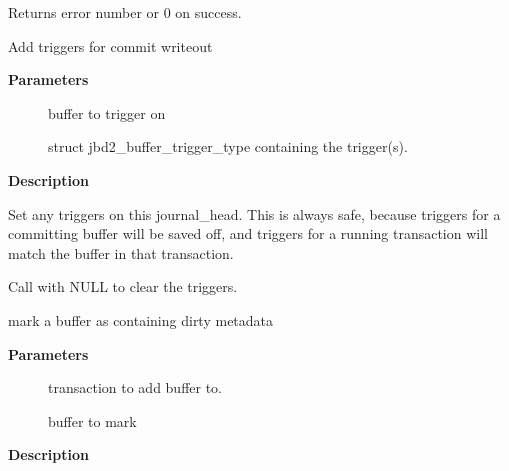 \documentclass[a4paper,8pt,english]{sphinxmanual}
\begin{document}
Returns error number or 0 on success.

\begin{fulllineitems}
\label{filesystems/index:c.jbd2_journal_set_triggers}
Add triggers for commit writeout

\end{fulllineitems}


\textbf{Parameters}
\begin{description}
\item[{}] \leavevmode
buffer to trigger on

\item[{}] \leavevmode
struct jbd2\_buffer\_trigger\_type containing the trigger(s).

\end{description}

\textbf{Description}

Set any triggers on this journal\_head.  This is always safe, because
triggers for a committing buffer will be saved off, and triggers for
a running transaction will match the buffer in that transaction.

Call with NULL to clear the triggers.

\begin{fulllineitems}
\label{filesystems/index:c.jbd2_journal_dirty_metadata}
mark a buffer as containing dirty metadata

\end{fulllineitems}


\textbf{Parameters}
\begin{description}
\item[{}] \leavevmode
transaction to add buffer to.

\item[{}] \leavevmode
buffer to mark

\end{description}

\textbf{Description}
\end{document}
